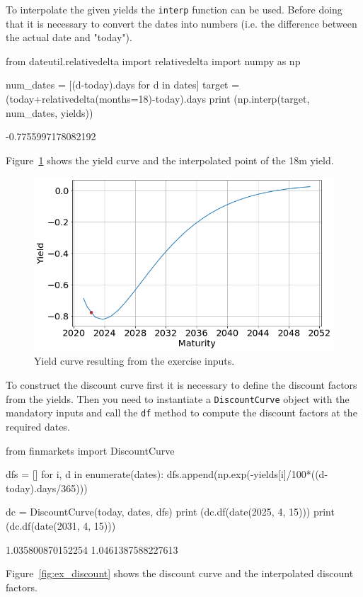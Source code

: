 \cprotEnv\begin{solution}
To interpolate the given yields the \texttt{interp} function can be used. Before doing that it is necessary to convert the dates into numbers (i.e. the difference between the actual date and "today").
\begin{ipython}
from dateutil.relativedelta import relativedelta
import numpy as np

num_dates = [(d-today).days for d in dates]
target = (today+relativedelta(months=18)-today).days
print (np.interp(target, num_dates, yields))
\end{ipython}
\begin{ioutput}
-0.7755997178082192
\end{ioutput}

Figure~\ref{fig:ex_yield} shows the yield curve and the interpolated point of the 18m yield.

\begin{figure}[htpb]
\centering
\includegraphics[width=0.7\linewidth]{figures/ex_yield}
\caption{Yield curve resulting from the exercise inputs.}
\label{fig:ex_yield}
\end{figure}

To construct the discount curve first it is necessary to define the discount factors from the yields. Then you need to instantiate a \texttt{DiscountCurve} object with the mandatory inputs and call the \texttt{df} method to compute the discount factors at the required dates.
\begin{ipython}
from finmarkets import DiscountCurve

dfs = []
for i, d in enumerate(dates):
    dfs.append(np.exp(-yields[i]/100*((d-today).days/365)))
    
dc = DiscountCurve(today, dates, dfs)
print (dc.df(date(2025, 4, 15)))
print (dc.df(date(2031, 4, 15)))
\end{ipython}
\begin{ioutput}
1.035800870152254
1.0461387588227613
\end{ioutput}
\noindent
Figure~\ref{fig:ex_discount} shows the discount curve and the interpolated discount factors.


\end{solution}
